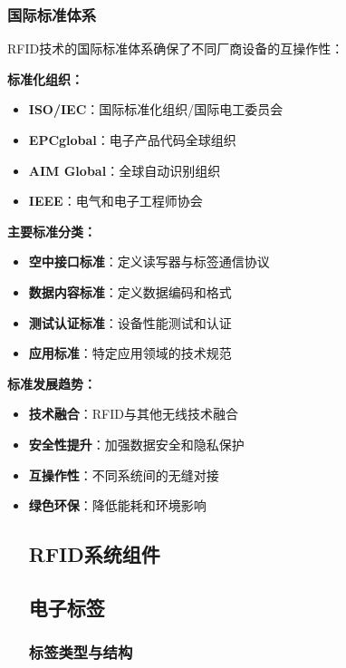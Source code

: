 \documentclass[12pt,UTF8]{ctexbook}
\begin{document}
\begin{itemize}[leftmargin=3.5em]
\section{国际标准体系}

RFID技术的国际标准体系确保了不同厂商设备的互操作性：

\textbf{标准化组织：}
\begin{itemize}[leftmargin=3.5em]
    \item \textbf{ISO/IEC}：国际标准化组织/国际电工委员会
    \item \textbf{EPCglobal}：电子产品代码全球组织
    \item \textbf{AIM Global}：全球自动识别组织
    \item \textbf{IEEE}：电气和电子工程师协会
\end{itemize}

\textbf{主要标准分类：}
\begin{itemize}[leftmargin=3.5em]
    \item \textbf{空中接口标准}：定义读写器与标签通信协议
    \item \textbf{数据内容标准}：定义数据编码和格式
    \item \textbf{测试认证标准}：设备性能测试和认证
    \item \textbf{应用标准}：特定应用领域的技术规范
\end{itemize}

\textbf{标准发展趋势：}
\begin{itemize}[leftmargin=3.5em]
    \item \textbf{技术融合}：RFID与其他无线技术融合
    \item \textbf{安全性提升}：加强数据安全和隐私保护
    \item \textbf{互操作性}：不同系统间的无缝对接
    \item \textbf{绿色环保}：降低能耗和环境影响

\part{RFID系统组件}

\chapter{电子标签}

\section{标签类型与结构}


\end{itemize}
\end{itemize}
\end{document}
